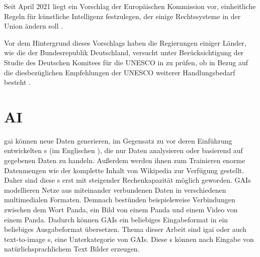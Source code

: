 \documentclass[12pt]{report}
\begin{document}
Seit April 2021 liegt ein Vorschlag der Europäischen Kommission vor, einheitliche Regeln für künstliche Intelligenz festzulegen, der einige Rechtssysteme in der Union ändern soll \cite{GesetzesentwurfEUComm}.

Vor dem Hintergrund dieses Vorschlags haben die Regierungen einiger Länder, wie die der Bundesrepublik Deutschland, versucht unter Berücksichtigung der Studie des Deutschen Komitees für die UNESCO in \cite[UNESCO-Empfehlung zur Ethik Künstlicher Intelligenz. Bedingungen zur Implementierung in Deutschland]{Kettemann} zu prüfen, ob in Bezug auf die diesbezüglichen Empfehlungen der UNESCO weiterer Handlungsbedarf besteht \cite{Deutscher_Bundestag}.  


\section{AI}\label{def_ki}
\gls{gai} können neue Daten generieren, im Gegensatz zu vor deren Einführung entwickelten s (im Englischen ), die nur Daten analysieren oder basierend auf gegebenen Daten zu handeln. Außerdem werden ihnen zum Trainieren enorme Datenmengen wie der komplette Inhalt von Wikipedia zur Verfügung gestellt. Daher sind diese s erst mit steigender Rechenkapazität möglich geworden. GAIs modellieren Netze aus miteinander verbundenen Daten in verschiedenen multimedialen Formaten. Demnach bestünden beispielsweise Verbindungen zwischen dem Wort Panda, ein Bild von einem Panda und einem Video von einem Panda. Dadurch können GAIs ein beliebiges Eingabeformat in ein beliebiges Ausgabeformat übersetzen. Thema dieser Arbeit sind \gls{igai} oder auch text-to-image s, eine Unterkategorie von GAIs. Diese s können nach Eingabe von natürlichsprachlichem Text Bilder erzeugen.
\cite{Roberto}

\end{document}
